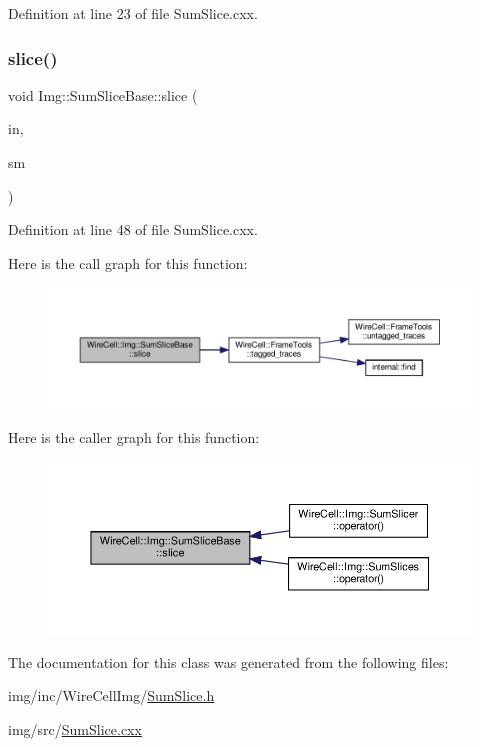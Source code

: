 Definition at line 23 of file Sum\+Slice.\+cxx.

\mbox{\label{class_wire_cell_1_1_img_1_1_sum_slice_base_a173581daeeac8e467120be1a0a9eea82}} 
\subsubsection{\texorpdfstring{slice()}{slice()}}
{\footnotesize\ttfamily void Img\+::\+Sum\+Slice\+Base\+::slice (\begin{DoxyParamCaption}\item[{const \hyperlink{class_wire_cell_1_1_i_data_aff870b3ae8333cf9265941eef62498bc}{I\+Frame\+::pointer} \&}]{in,  }\item[{\hyperlink{class_wire_cell_1_1_img_1_1_sum_slice_base_a282d10c443ad41866ab0595af2c56e54}{slice\+\_\+map\+\_\+t} \&}]{sm }\end{DoxyParamCaption})\hspace{0.3cm}{\ttfamily [protected]}}



Definition at line 48 of file Sum\+Slice.\+cxx.

Here is the call graph for this function\+:
\nopagebreak
\begin{figure}[H]
\begin{center}
\leavevmode
\includegraphics[width=350pt]{class_wire_cell_1_1_img_1_1_sum_slice_base_a173581daeeac8e467120be1a0a9eea82_cgraph}
\end{center}
\end{figure}
Here is the caller graph for this function\+:
\nopagebreak
\begin{figure}[H]
\begin{center}
\leavevmode
\includegraphics[width=350pt]{class_wire_cell_1_1_img_1_1_sum_slice_base_a173581daeeac8e467120be1a0a9eea82_icgraph}
\end{center}
\end{figure}


The documentation for this class was generated from the following files\+:\begin{DoxyCompactItemize}
\item 
img/inc/\+Wire\+Cell\+Img/\hyperlink{_sum_slice_8h}{Sum\+Slice.\+h}\item 
img/src/\hyperlink{_sum_slice_8cxx}{Sum\+Slice.\+cxx}\end{DoxyCompactItemize}
